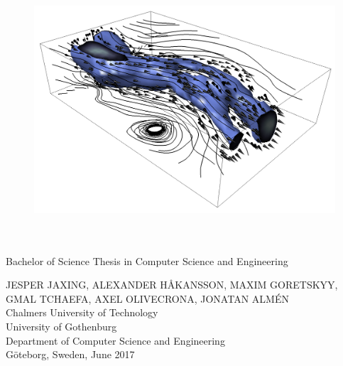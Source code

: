 
\begin{titlepage}
			
\addtolength{\voffset}{2cm}

\begin{figure}[H]
\centering
\vspace{2cm}	%
\includegraphics[width=0.9\linewidth]{figure/Wind.png}
\end{figure}

\mbox{}
\renewcommand{\familydefault}{\sfdefault} \normalfont %
\begin{flushleft}
\textbf{{\Huge \varthetitle}} 	\\[0.5cm]
{\LARGE \varthesubtitle}\\[0.2cm]
Bachelor of Science Thesis in Computer Science and Engineering \setlength{\parskip}{0.5cm}

{\Large JESPER JAXING, ALEXANDER HÅKANSSON, MAXIM GORETSKYY, GMAL TCHAEFA, AXEL OLIVECRONA, JONATAN ALMÉN} \setlength{\parskip}{1.9cm}\\
\vfill
Chalmers University of Technology \\
University of Gothenburg \\
Department of Computer Science and Engineering \\
Göteborg, Sweden, June 2017

\end{flushleft}
\end{titlepage}

